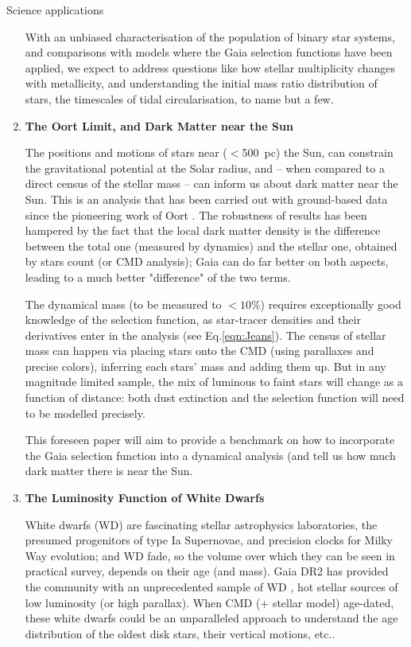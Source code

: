 \begin{workpackage}{Science applications}
\begin{wpobjectives}
\begin{enumerate}
{        With an unbiased characterisation of the population of binary star systems, and comparisons with models where the Gaia selection functions have been applied, we expect to address questions like how stellar multiplicity changes with metallicity, and understanding the initial mass ratio distribution of stars, the timescales of tidal circularisation, to name but a few.}
      \item \textbf{The Oort Limit, and Dark Matter near the Sun}{
      The positions and motions of stars near ($<$500~pc) the Sun, can constrain the gravitational potential at the Solar radius, and -- when compared to a direct census of the stellar mass -- can inform us about dark matter near the Sun. This is an analysis that has been carried out with ground-based data since the pioneering work of Oort \citep[e.g.][]{Read2014}. The robustness of results has been hampered by the fact that the local dark matter density is the difference between the total one (measured by dynamics) and the stellar one, obtained by stars count (or CMD analysis); Gaia can do far better on both aspects, leading to a much better "difference" of the two terms. 
      
      The dynamical mass (to be measured to $<10$\%) requires exceptionally good knowledge of the selection function, as star-tracer densities and their derivatives enter in the analysis (see Eq.\ref{eqn:Jeans}). The census of stellar mass can happen via placing stars onto the CMD (using parallaxes and precise colors), inferring each stars' mass and adding them up. But in any magnitude limited sample, the mix of luminous to faint stars will change as a function of distance: both dust extinction and the selection function will need to be modelled precisely. 
      
      This foreseen paper will aim  to provide a benchmark on how to incorporate the Gaia selection function into a dynamical analysis (and tell us how much dark matter there is near the Sun.}
      
     
      \item \textbf{The Luminosity Function of White Dwarfs}{
      White dwarfs (WD) are fascinating stellar astrophysics laboratories, the presumed progenitors of type Ia Supernovae, and precision clocks for Milky Way evolution; and WD fade, so the volume over which they can be seen in practical survey, depends on their age (and mass).
      Gaia DR2 has provided the community with an unprecedented sample of WD \citep{WD_DR2}, hot stellar sources of low luminosity (or high parallax).
      When CMD (+ stellar model) age-dated, these white dwarfs could be an unparalleled approach to understand the age distribution of the oldest disk stars, their vertical motions, etc..
      
}
\end{enumerate}
\end{wpobjectives}
\end{workpackage}
